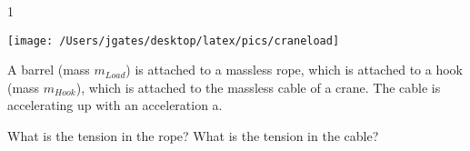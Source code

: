 
\AddToShipoutPicture*{\BackgroundPic}

\addtocounter {ProbNum} {1}

\begin{floatingfigure}[r]{.25\textwidth}
\texttt{[image: /Users/jgates/desktop/latex/pics/craneload]}
\end{floatingfigure}
 
{\bf \Large{}} A barrel (mass ${m_{Load}}$) is attached to a massless rope, which is attached to a hook (mass  ${m_{Hook}}$), which is attached to the massless cable of a crane. The cable is accelerating up with an acceleration a. 

\bigskip
What is the tension in the rope? What is the tension in the cable?



\vfill
\newpage
